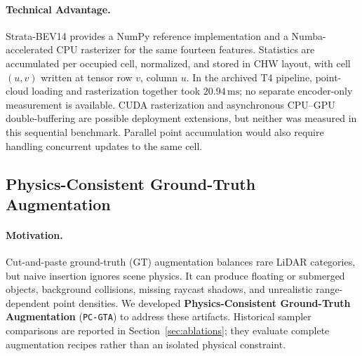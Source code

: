 \paragraph{Technical Advantage.}
Strata-BEV14 provides a NumPy reference implementation and a Numba-accelerated CPU rasterizer for the same fourteen features. Statistics are accumulated per occupied cell, normalized, and stored in CHW layout, with cell $(u,v)$ written at tensor row $v$, column $u$. In the archived T4 pipeline, point-cloud loading and rasterization together took $20.94\,\text{ms}$; no separate encoder-only measurement is available. CUDA rasterization and asynchronous CPU--GPU double-buffering are possible deployment extensions, but neither was measured in this sequential benchmark. Parallel point accumulation would also require handling concurrent updates to the same cell.

\subsection{Physics-Consistent Ground-Truth Augmentation}
\label{sec:pc_gta}

\paragraph{Motivation.}
Cut-and-paste ground-truth (GT) augmentation balances rare LiDAR categories, but naive insertion ignores scene physics. It can produce floating or submerged objects, background collisions, missing raycast shadows, and unrealistic range-dependent point densities. We developed \textbf{Physics-Consistent Ground-Truth Augmentation} (\texttt{PC-GTA}) to address these artifacts. Historical sampler comparisons are reported in Section~\ref{sec:ablations}; they evaluate complete augmentation recipes rather than an isolated physical constraint.

